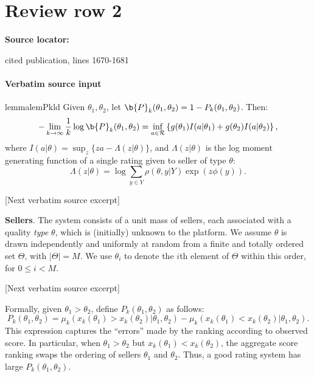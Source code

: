 \documentclass[10pt]{article}
\begin{document}
\section*{Review row 2}
\textbf{Source locator:} {\footnotesize\raggedright cited publication, lines 1670-\allowbreak{}1681\par}
\paragraph{Verbatim source input}
\begin{ReviewVerbatim}
\begin{restatable}{lemma}{lemPkld}
	\label{lem:Pk_LD}
	Given $\theta_1, \theta_2$, let $\b{P}_k(\theta_1, \theta_2) = 1 - P_k(\theta_1, \theta_2)$.  Then:
	\begin{equation}
	\label{eq:LDrate}
	- \lim_{k \to \infty} \frac{1}{k} \log \b{P}_k(\theta_1, \theta_2) = \inf_{a \in \mathcal{R}} \left \{ g(\theta_1) I(a|\theta_1) + g(\theta_2) I(a|\theta_2) \right \},
	\end{equation}
	where $I(a|\theta) = \sup_z \{ za - \Lambda(z|\theta) \}$, and $\Lambda(z|\theta)$ is the log moment generating function of a single rating given to seller of type $\theta$:
	\[ \Lambda(z|\theta) = \log \sum_{y \in Y} \rho(\theta, y | Y) \exp( z \phi(y) ). \]
\end{restatable}

[Next verbatim source excerpt]

{\bf Sellers}.  The system consists of a unit mass of sellers, each associated with a quality \textit{type} $\theta$, which is (initially) unknown to the platform. We assume $\theta$ is drawn independently and uniformly at random from a finite and totally ordered set $\Theta$, with $|\Theta| = M$. We use $\theta_i$ to denote the $i$th element of $\Theta$ within this order, for $0\leq i < M$.

[Next verbatim source excerpt]

Formally, given $\theta_1 > \theta_2$, define $P_k(\theta_1, \theta_2)$ as follows:
\begin{equation}
\label{eq:Pk}
P_k(\theta_1, \theta_2) = \mu_k(x_k(\theta_1) > x_k(\theta_2)|\theta_1, \theta_2) - \mu_k(x_k(\theta_1) < x_k(\theta_2)|\theta_1, \theta_2).
\end{equation}
This expression captures the ``errors'' made by the ranking according to observed score.  In particular, when $\theta_1 > \theta_2$ but $x_k(\theta_1) < x_k(\theta_2)$, the aggregate score ranking swaps the ordering of sellers $\theta_1$ and $\theta_2$.  Thus, a good rating system has large $P_k(\theta_1, \theta_2)$.


\end{ReviewVerbatim}
\end{document}
